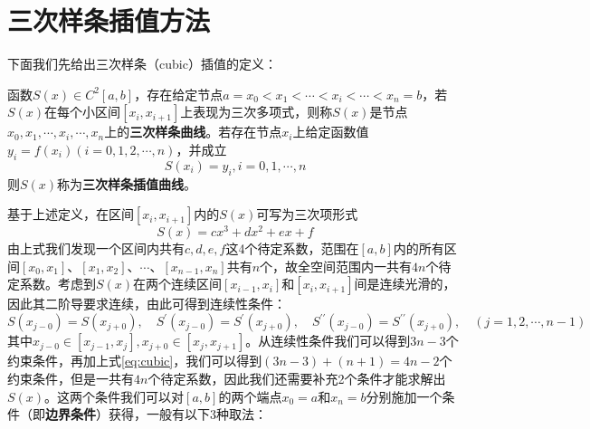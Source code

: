 \section{三次样条插值方法}
下面我们先给出三次样条（cubic）插值的定义：
\begin{definition}[三次样条插值]
	函数$S(x) \in C^2 [a, b]$，存在给定节点$a = x_0 < x_1 < \cdots < x_i < \cdots < x_n = b$，若$S(x)$在每个小区间$[x_i, x_{i+1}]$上表现为三次多项式，则称$S(x)$是节点$x_0, x_1, \cdots, x_i , \cdots, x_n$上的\textbf{三次样条曲线}。若存在节点$x_i$上给定函数值$y_i = f(x_i)(i = 0, 1, 2, \cdots, n)$，并成立
	\begin{equation}
	    S(x_i) = y_i , i = 0, 1, \cdots, n
	\end{equation} 
	则$S(x)$称为\textbf{三次样条插值曲线}。	
\end{definition}
基于上述定义，在区间$[x_i, x_{i+1}]$内的$S(x)$可写为三次项形式
\begin{equation}
	S(x) = c x^3 + d x^2 + e x + f	\label{eq:cubic}
\end{equation} 
由上式我们发现一个区间内共有$c, d, e, f$这4个待定系数，范围在$[a, b]$内的所有区间$[x_0, x_1]$、$[x_1, x_2]$、$\cdots$、$[x_{n-1}, x_{n}]$共有$n$个，故全空间范围内一共有$4n$个待定系数。考虑到$S(x)$在两个连续区间$[x_{i-1}, x_i]$和$[x_i, x_{i+1}]$间是连续光滑的，因此其二阶导要求连续，由此可得到连续性条件：
\begin{equation*}
	S(x_{j-0}) = S(x_{j+0}), \quad S^{\prime}(x_{j-0}) = S^{\prime}(x_{j+0}),\quad S^{\prime\prime}(x_{j-0}) = S^{\prime\prime}(x_{j+0}), \quad (j = 1, 2, \cdots, n-1)
\end{equation*} 
其中$x_{j-0}\in [x_{j-1}, x_j], x_{j+0} \in [x_{j}, x_{j+1}]$。从连续性条件我们可以得到$3n-3$个约束条件，再加上式\eqref{eq:cubic}，我们可以得到$(3n-3) + (n + 1)= 4n - 2$个约束条件，但是一共有$4n$个待定系数，因此我们还需要补充2个条件才能求解出$S(x)$。这两个条件我们可以对$[a, b]$的两个端点$x_0 = a$和$x_n = b$分别施加一个条件（即\textbf{边界条件}）获得，一般有以下3种取法：
